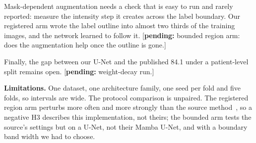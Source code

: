 \documentclass[runningheads]{llncs}
\newcommand{\pending}[1]{\textcolor{red!70!black}{[\textbf{pending:} #1]}}
\begin{document}
Mask-dependent augmentation needs a check that is easy to run and rarely
reported: measure the intensity step it creates across the label boundary. Our
registered arm wrote the label outline into almost two thirds of the training
images, and the network learned to follow it. \pending{bounded region arm: does
the augmentation help once the outline is gone.}

Finally, the gap between our U-Net and the published 84.1 under a
patient-level split remains open. \pending{weight-decay run.}

\noindent\textbf{Limitations.}
One dataset, one architecture family, one seed per fold and five folds, so
intervals are wide. The protocol comparison is unpaired. The registered region arm
perturbs more often and more strongly than the source method~\cite{yurdakul2026},
so a negative H3 describes this implementation, not theirs; the bounded arm
tests the source's settings but on a U-Net, not their Mamba U-Net, and with a
boundary band width we had to choose.



\end{document}
